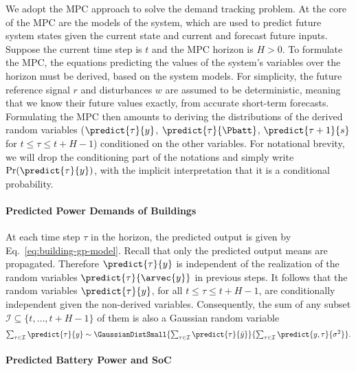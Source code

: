 We adopt the MPC approach \cite{maciejowski_predictive_2002} to solve the demand tracking problem. 
At the core of the MPC are the models of the system, which are used to predict future system states given the current state and current and forecast future inputs.
Suppose the current time step is \(t\) and the MPC horizon is \(H > 0\).
To formulate the MPC, the equations predicting the values of the system's variables over the horizon must be derived, based on the system models.
For simplicity, the future reference signal \(r\) and disturbances \(w\) are assumed to be deterministic, meaning that we know their future values exactly, \eg from accurate short-term forecasts.
Formulating the MPC then amounts to deriving the distributions of the derived random variables (\(\predict{\tau}{y}\), \(\predict{\tau}{\Pbatt}\), \(\predict{\tau+1}{s}\) for \(t \leq \tau \leq t+H-1\)) conditioned on the other variables.  
For notational brevity, we will drop the conditioning part of the notations and simply write \(\Pr(\predict{\tau}{y})\), with the implicit interpretation that it is a conditional probability.


\paragraph{Predicted Power Demands of Buildings}


At each time step \(\tau\) in the horizon, the predicted output is given by Eq.~\eqref{eq:building-gp-model}.
Recall that only the predicted output means are propagated.
Therefore \(\predict{\tau}{y}\) is independent of the realization of the random variables \(\predict{\tau}{\arvec{y}}\) in previous steps.
It follows that the random variables \(\predict{\tau}{y}\), for all \(t \leq \tau \leq t + H - 1\), are conditionally independent given the non-derived variables. 
Consequently, the sum of any subset \(\mathcal{I} \subseteq \{t,\dots,t+H-1\}\) of them is also a Gaussian random variable
\begin{equation}
\label{eq:sum-of-power-random-vars}
\textstyle\sum_{\tau \in \mathcal{I}} \predict{\tau}{y} \sim \GaussianDistSmall{\textstyle\sum_{\tau \in \mathcal{I}} \predict{\tau}{\bar{y}}}{\textstyle\sum_{\tau \in \mathcal{I}} \predict{y,\tau}{\sigma^2}} \text.
\end{equation}


\paragraph{Predicted Battery Power and SoC}


